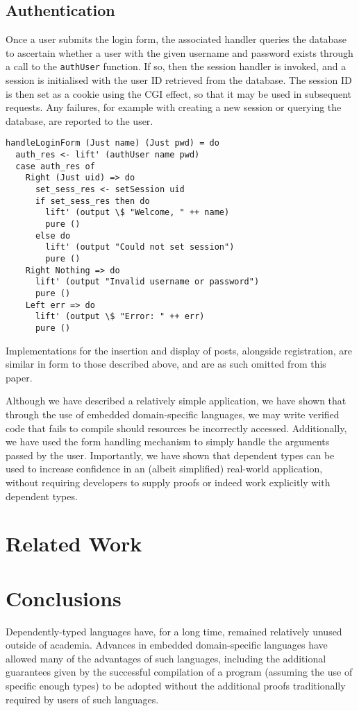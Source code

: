 \documentclass[preprint]{sigplanconf}
\begin{document}
\subsection{Authentication}
Once a user submits the login form, the associated handler queries the database to ascertain whether a user with the given username and password exists through a call to the \texttt{authUser} function. If so, then the session handler is invoked, and a session is initialised with the user ID retrieved from the database. The session ID is then set as a cookie using the CGI effect, so that it may be used in subsequent requests. Any failures, for example with creating a new session or querying the database, are reported to the user.
\begin{Verbatim}
handleLoginForm (Just name) (Just pwd) = do
  auth_res <- lift' (authUser name pwd)
  case auth_res of
    Right (Just uid) => do
      set_sess_res <- setSession uid
      if set_sess_res then do
        lift' (output \$ "Welcome, " ++ name)
        pure ()
      else do
        lift' (output "Could not set session")
        pure ()
    Right Nothing => do
      lift' (output "Invalid username or password")
      pure ()
    Left err => do
      lift' (output \$ "Error: " ++ err)
      pure ()
\end{Verbatim}
Implementations for the insertion and display of posts, alongside registration, are similar in form to those described above, and are as such omitted from this paper.

Although we have described a relatively simple application, we have shown that through the use of embedded domain-specific languages, we may write verified code that fails to compile should resources be incorrectly accessed. Additionally, we have used the form handling mechanism to simply handle the arguments passed by the user. Importantly, we have shown that dependent types can be used to increase confidence in an (albeit simplified) real-world application, without requiring developers to supply proofs or indeed work explicitly with dependent types. 

\section{Related Work}


\section{Conclusions}
Dependently-typed languages have, for a long time, remained relatively unused outside of academia. Advances in embedded domain-specific languages have allowed many of the advantages of such languages, including the additional guarantees given by the successful compilation of a program (assuming the use of specific enough types) to be adopted without the additional proofs traditionally required by users of such languages.
\end{document}
